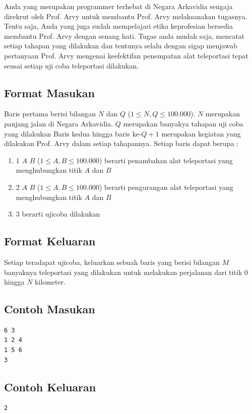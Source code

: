 \documentclass{article}
\begin{document}
Anda yang merupakan programmer terhebat di Negara Arkavidia sengaja direkrut oleh Prof. Arvy untuk membantu Prof. Arvy melaksanakan tugasnya. Tentu saja, Anda yang juga sudah mempelajari etika keprofesian bersedia membantu Prof. Arvy dengan senang hati. Tugas anda mudah saja, mencatat setiap tahapan yang dilakukan dan tentunya selalu dengan sigap menjawab pertanyaan Prof. Arvy mengenai keefektifan penempatan alat teleportasi tepat seusai setiap uji coba teleportasi dilakukan.

\subsection*{Format Masukan}
Baris pertama berisi bilangan $N$ dan $Q$ ($1 \leq N, Q \leq 100.000$). $N$ merupakan panjang jalan di Negara Arkavidia. $Q$ merupakan banyakya tahapan uji coba yang dilakukan
Baris kedua hingga baris ke-$Q+1$ merupakan kegiatan yang dilakukan Prof. Arvy dalam setiap tahapannya. Setiap baris dapat berupa :
\begin{enumerate}
    \setlength\itemsep{0pt}
    \item $1$ $A$ $B$ ($1 \leq A, B \leq 100.000$) berarti penambahan alat teleportasi yang menghubungkan titik $A$ dan $B$
    \item $2$ $A$ $B$ ($1 \leq A, B \leq 100.000$) berarti pengurangan alat teleportasi yang menghubungkan titik $A$ dan $B$
    \item $3$ berarti ujicoba dilakukan    
\end{enumerate}


\subsection*{Format Keluaran}
Setiap teradapat ujicoba, keluarkan sebuah baris yang berisi bilangan $M$ banyaknya teleportasi yang dilakukan untuk melakukan perjalanan dari titik $0$ hingga $N$ kilometer. 
\\

\begin{multicols}{2}
\subsection*{Contoh Masukan}
\begin{lstlisting}
6 3
1 2 4
1 5 6
3
\end{lstlisting}
\columnbreak
\subsection*{Contoh Keluaran}
\begin{lstlisting}
2
\end{lstlisting}
\vfill
\null
\end{multicols}
\end{document}
